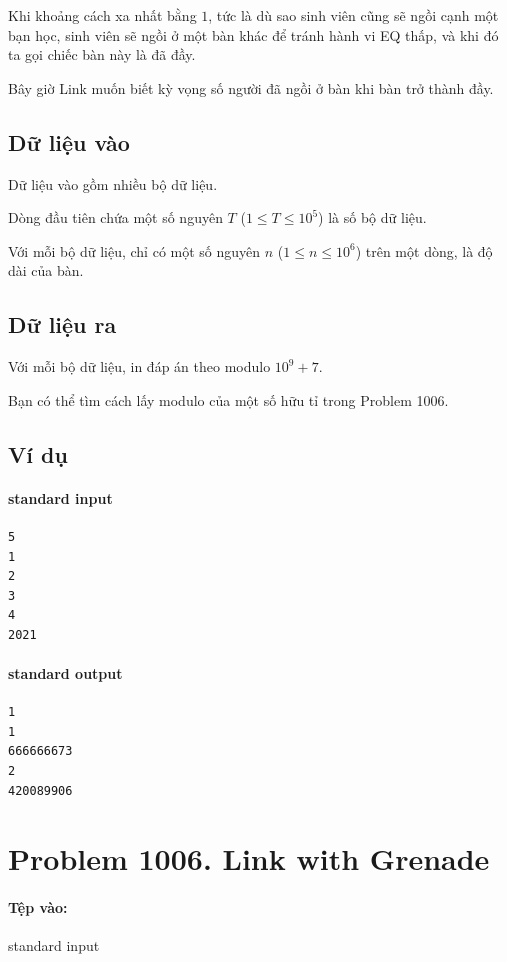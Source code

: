 \documentclass[11pt]{article}
\begin{document}
Khi khoảng cách xa nhất bằng \(1\), tức là dù sao sinh viên cũng sẽ ngồi cạnh
một bạn học, sinh viên sẽ ngồi ở một bàn khác để tránh hành vi EQ thấp, và
khi đó ta gọi chiếc bàn này là đã đầy.

Bây giờ Link muốn biết kỳ vọng số người đã ngồi ở bàn khi bàn trở thành đầy.

\subsection*{Dữ liệu vào}

Dữ liệu vào gồm nhiều bộ dữ liệu.

Dòng đầu tiên chứa một số nguyên \(T\) (\(1\le T\le 10^5\)) là số bộ dữ liệu.

Với mỗi bộ dữ liệu, chỉ có một số nguyên \(n\) (\(1\le n\le 10^6\)) trên một
dòng, là độ dài của bàn.

\subsection*{Dữ liệu ra}

Với mỗi bộ dữ liệu, in đáp án theo modulo \(10^9+7\).

Bạn có thể tìm cách lấy modulo của một số hữu tỉ trong Problem 1006.

\subsection*{Ví dụ}

\paragraph{standard input}
\begin{verbatim}
5
1
2
3
4
2021
\end{verbatim}

\paragraph{standard output}
\begin{verbatim}
1
1
666666673
2
420089906
\end{verbatim}

\section{Problem 1006. Link with Grenade}

\paragraph{Tệp vào:} standard input
\end{document}

